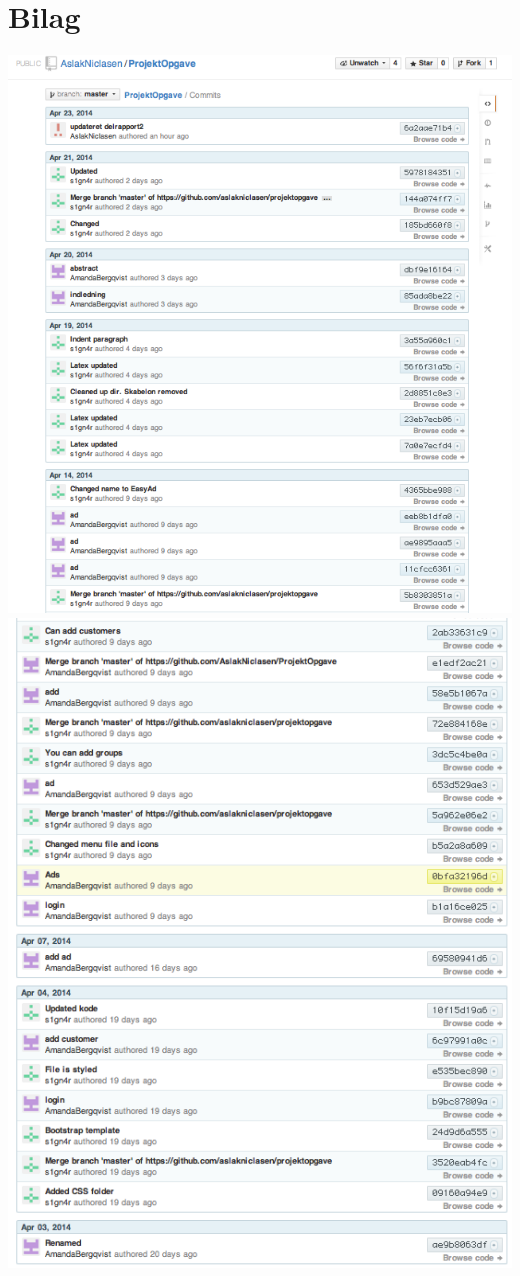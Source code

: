\documentclass[a4paper,12pt]{article}
\begin{document}
\section{Bilag}
\includegraphics[width=\linewidth]{log1.png}
\newpage
\includegraphics[width=\linewidth]{log2.png}
\end{document}
